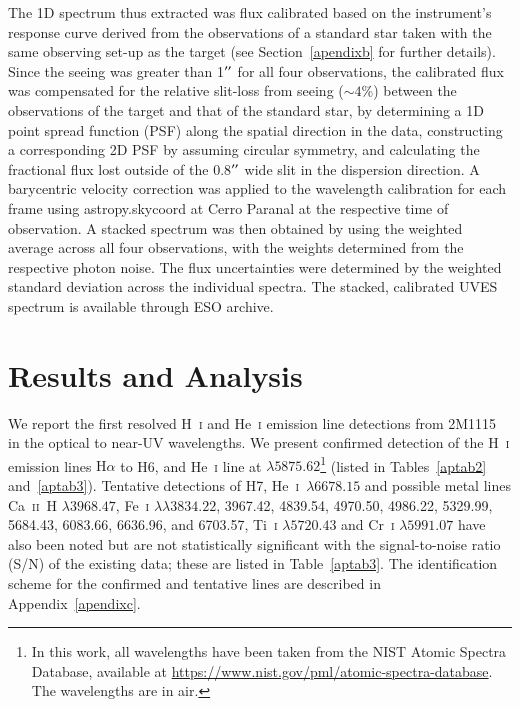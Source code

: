 \documentclass{aa}
\newcommand{\Ha}{\ensuremath{\mathrm{H}\alpha}\xspace}
\newcommand{\Hi}{H~\textsc{i}\xspace}
\newcommand{\Hei}{He~\textsc{i}\xspace}
\begin{document}
The 1D spectrum thus extracted was flux calibrated based on the instrument's response curve derived from the observations of a standard star taken with the same observing set-up as the target  (see Section~\ref{apendixb} for further details).
Since the seeing was greater than 1$^{\prime\prime}$ for all four observations, the calibrated flux was compensated for the relative slit-loss from seeing ($\sim4$\%) between the observations of the target and that of the standard star, by determining a 1D point spread function (PSF) along the spatial direction in the data, constructing a corresponding 2D PSF by assuming circular symmetry, and calculating the fractional flux lost outside of the 0.8$^{\prime\prime}$ wide slit in the dispersion direction. A barycentric velocity correction was applied to the wavelength calibration for each frame using {\selectfont
astropy.skycoord} at Cerro Paranal at the respective time of observation. A stacked spectrum was then obtained by using the weighted average across all four observations, with the weights determined from the respective photon noise. The flux uncertainties were determined by the weighted standard deviation across the individual spectra. The stacked, calibrated UVES spectrum is available through ESO archive.

\section{Results and Analysis} \label{results}
We report the first resolved \Hi and \Hei emission line detections from 2M1115 in the optical to near-UV wavelengths. We present confirmed detection of the \Hi emission lines \Ha to H6, and \Hei line at $\lambda5875.62$\footnote{In this work, all wavelengths have been taken from the 
NIST Atomic Spectra Database, available at \url{https://www.nist.gov/pml/atomic-spectra-database}. The wavelengths are in air.} (listed in Tables~\ref{aptab2} and~\ref{aptab3}). Tentative detections of H7, \Hei~$\lambda6678.15$ and possible metal lines Ca~\textsc{ii}~H $\lambda 3968.47$, Fe~\textsc{i} $\lambda\lambda 3834.22$, 3967.42, 4839.54, 4970.50, 4986.22, 5329.99, 5684.43, 6083.66, 6636.96, and 6703.57, Ti~\textsc{i} $\lambda5720.43$ and Cr~\textsc{i} $\lambda5991.07$ have also been noted but are not statistically significant with the signal-to-noise ratio (S/N) of the existing data; these are listed in Table~\ref{aptab3}. The identification scheme for the confirmed and tentative lines are described in Appendix~\ref{apendixc}.
\end{document}
